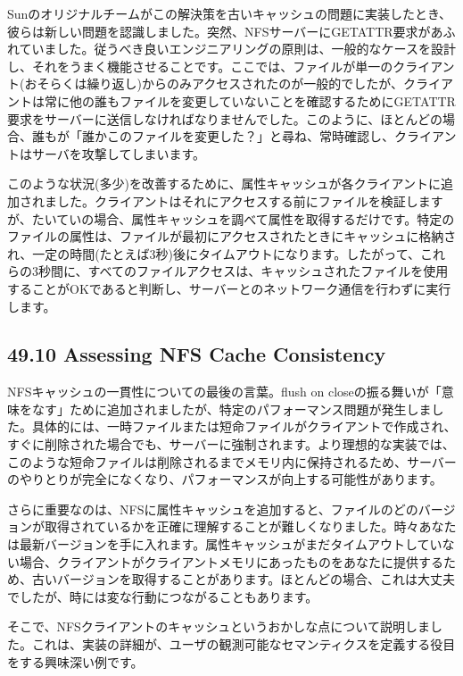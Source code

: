 Sunのオリジナルチームがこの解決策を古いキャッシュの問題に実装したとき、彼らは新しい問題を認識しました。突然、NFSサーバーにGETATTR要求があふれていました。従うべき良いエンジニアリングの原則は、一般的なケースを設計し、それをうまく機能させることです。ここでは、ファイルが単一のクライアント(おそらくは繰り返し)からのみアクセスされたのが一般的でしたが、クライアントは常に他の誰もファイルを変更していないことを確認するためにGETATTR要求をサーバーに送信しなければなりませんでした。このように、ほとんどの場合、誰もが「誰かこのファイルを変更した？」と尋ね、常時確認し、クライアントはサーバを攻撃してしまいます。

このような状況(多少)を改善するために、属性キャッシュが各クライアントに追加されました。クライアントはそれにアクセスする前にファイルを検証しますが、たいていの場合、属性キャッシュを調べて属性を取得するだけです。特定のファイルの属性は、ファイルが最初にアクセスされたときにキャッシュに格納され、一定の時間(たとえば3秒)後にタイムアウトになります。したがって、これらの3秒間に、すべてのファイルアクセスは、キャッシュされたファイルを使用することがOKであると判断し、サーバーとのネットワーク通信を行わずに実行します。

\hypertarget{assessing-nfs-cache-consistency}{%
\subsection*{49.10 Assessing NFS Cache
Consistency}\label{assessing-nfs-cache-consistency}}

NFSキャッシュの一貫性についての最後の言葉。flush on
closeの振る舞いが「意味をなす」ために追加されましたが、特定のパフォーマンス問題が発生しました。具体的には、一時ファイルまたは短命ファイルがクライアントで作成され、すぐに削除された場合でも、サーバーに強制されます。より理想的な実装では、このような短命ファイルは削除されるまでメモリ内に保持されるため、サーバーのやりとりが完全になくなり、パフォーマンスが向上する可能性があります。

さらに重要なのは、NFSに属性キャッシュを追加すると、ファイルのどのバージョンが取得されているかを正確に理解することが難しくなりました。時々あなたは最新バージョンを手に入れます。属性キャッシュがまだタイムアウトしていない場合、クライアントがクライアントメモリにあったものをあなたに提供するため、古いバージョンを取得することがあります。ほとんどの場合、これは大丈夫でしたが、時には変な行動につながることもあります。

そこで、NFSクライアントのキャッシュというおかしな点について説明しました。これは、実装の詳細が、ユーザの観測可能なセマンティクスを定義する役目をする興味深い例です。

